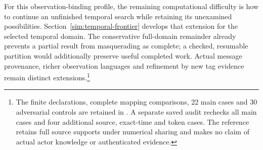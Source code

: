 For this observation-binding profile, the remaining computational difficulty is how to continue an unfinished temporal search while retaining its unexamined possibilities. Section~\ref{sim:temporal-frontier} develops that extension for the selected temporal domain. The conservative full-domain remainder already prevents a partial result from masquerading as complete; a checked, resumable partition would additionally preserve useful completed work. Actual message provenance, richer observation languages and refinement by new tag evidence remain distinct extensions.\footnote{The finite declarations, complete mapping comparisons, 22 main cases and 30 adversarial controls are retained in . A separate saved audit rechecks all main cases and four additional source, exact-time and token cases. The reference retains full source supports under numerical sharing and makes no claim of actual actor knowledge or authenticated evidence.}
